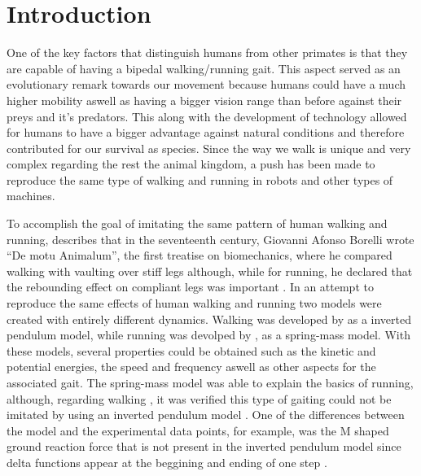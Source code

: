 

\section{Introduction}
One of the key factors that distinguish humans from other primates is that they are capable of having a bipedal walking/running gait. This aspect served as an evolutionary remark towards our movement because humans could have a much higher mobility aswell as having a bigger vision range than before against their preys and it's predators. This along with the development of technology allowed for humans to have a bigger advantage against natural conditions and therefore contributed for our survival as species. Since the way we walk is unique and very complex \cite{Mochon & McMahon} regarding the rest the animal kingdom, a push has been made to reproduce the same type of walking and running in robots and other types of machines.


To accomplish the goal of imitating the same pattern of human walking and running, \cite {Seyfarth et al. 2006 } describes that in the seventeenth century, Giovanni Afonso Borelli wrote ``De motu Animalum'', the first treatise on biomechanics, where he compared walking with vaulting over stiff legs although, while for running, he declared that the rebounding effect on compliant legs was important \cite{Borelli 1685}. In an attempt to reproduce the same effects of human walking and running two models were created with entirely different dynamics. Walking was developed by \cite{Alexander 1976; Mochon & McMahon 1980;Cavagna 1976} as a inverted pendulum model, while running was devolped by \cite{Blickhan 1989; McMahon & Cheng 1990}, as a spring-mass model. With these models, several properties could be obtained such as the kinetic and potential energies, the speed and frequency aswell as other aspects for the associated gait. The spring-mass model was able to explain the basics of running, although, regarding walking , it was verified this type of gaiting could not be imitated by using an inverted pendulum model \cite{Full & Koditchek 1999}. One of the differences between the model and the experimental data points, for example, was the M shaped ground reaction force that is not present in the inverted pendulum model since  delta functions appear at the beggining and ending of one step \cite{Pandy 2003}.

